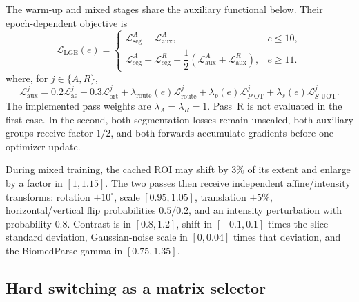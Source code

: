 \documentclass[10pt]{article}
\newcommand{\cL}{\mathcal{L}}
\begin{document}
The warm-up and mixed stages share the auxiliary functional below.  Their
epoch-dependent objective is
\begin{equation}
 \boxed{\cL_{\mathrm{LGE}}(e)=\begin{cases}
   \cL^A_{\mathrm{seg}}+\cL^A_{\mathrm{aux}},&e\leq10,\\[1mm]
   \cL^A_{\mathrm{seg}}+\cL^R_{\mathrm{seg}}
   +\dfrac12(\cL^A_{\mathrm{aux}}+\cL^R_{\mathrm{aux}}),&e\geq11.
 \end{cases}}
\label{eq:unified-lge-objective}
\end{equation}
where, for $j\in\{A,R\}$,
\begin{equation}
 \cL^j_{\mathrm{aux}}
 =0.2\cL^j_{\mathrm{ae}}+0.3\cL^j_{\mathrm{ort}}
  +\lambda_{\mathrm{route}}(e)\cL^j_{\mathrm{route}}
  +\lambda_p(e)\cL^j_{P\text{-OT}}
  +\lambda_s(e)\cL^j_{S\text{-UOT}}.
\end{equation}
The implemented pass weights are $\lambda_A=\lambda_R=1$.  Pass~R is not
evaluated in the first case.  In the second, both segmentation losses remain
unscaled, both auxiliary groups receive factor $1/2$, and both forwards
accumulate gradients before one optimizer update.

During mixed training, the cached ROI may shift by $3\%$ of its extent and
enlarge by a factor in $[1,1.15]$.  The two passes then receive independent
affine/intensity transforms: rotation $\pm10^\circ$, scale $[0.95,1.05]$,
translation $\pm5\%$, horizontal/vertical flip probabilities $0.5/0.2$, and
an intensity perturbation with probability $0.8$.  Contrast is in $[0.8,1.2]$,
shift in $[-0.1,0.1]$ times the slice standard deviation, Gaussian-noise scale
in $[0,0.04]$ times that deviation, and the BiomedParse gamma in
$[0.75,1.35]$.

\subsection{Hard switching as a matrix selector}
\end{document}
